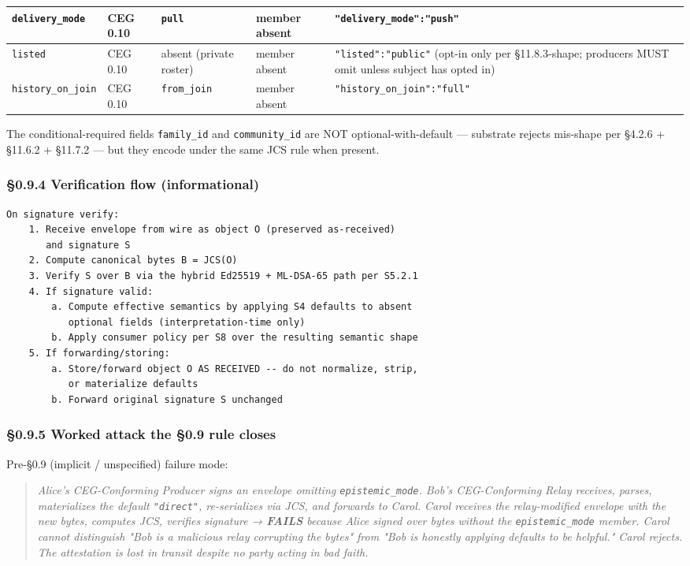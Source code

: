 \documentclass[11pt]{article}
\begin{document}
{\begin{longtable}{|p{3.2cm}|p{3.2cm}|p{3.2cm}|p{3.2cm}|p{3.2cm}|}
\texttt{delivery\_mode} & CEG 0.10 & \texttt{pull} & member absent & \texttt{"delivery\_mode":"push"} \\ \hline
\texttt{listed} & CEG 0.10 & absent (private roster) & member absent & \texttt{"listed":"public"} (opt-in only per §11.8.3-shape; producers MUST omit unless subject has opted in) \\ \hline
\texttt{history\_on\_join} & CEG 0.10 & \texttt{from\_join} & member absent & \texttt{"history\_on\_join":"full"} \\ \hline
\end{longtable}}


The conditional-required fields \texttt{family\_id} and \texttt{community\_id} are NOT optional-with-default — substrate rejects mis-shape per §4.2.6 + §11.6.2 + §11.7.2 — but they encode under the same JCS rule when present.


\subsubsection*{§0.9.4 Verification flow (informational)}


\begin{lstlisting}
On signature verify:
    1. Receive envelope from wire as object O (preserved as-received)
       and signature S
    2. Compute canonical bytes B = JCS(O)
    3. Verify S over B via the hybrid Ed25519 + ML-DSA-65 path per S5.2.1
    4. If signature valid:
        a. Compute effective semantics by applying S4 defaults to absent
           optional fields (interpretation-time only)
        b. Apply consumer policy per S8 over the resulting semantic shape
    5. If forwarding/storing:
        a. Store/forward object O AS RECEIVED -- do not normalize, strip,
           or materialize defaults
        b. Forward original signature S unchanged
\end{lstlisting}

\subsubsection*{§0.9.5 Worked attack the §0.9 rule closes}


Pre-§0.9 (implicit / unspecified) failure mode:


\begin{quote}\itshape Alice's CEG-Conforming Producer signs an envelope omitting \texttt{epistemic\_mode}. Bob's CEG-Conforming Relay receives, parses, materializes the default \texttt{"direct"}, re-serializes via JCS, and forwards to Carol. Carol receives the relay-modified envelope with the new bytes, computes JCS, verifies signature → \textbf{FAILS} because Alice signed over bytes without the \texttt{epistemic\_mode} member. Carol cannot distinguish "Bob is a malicious relay corrupting the bytes" from "Bob is honestly applying defaults to be helpful." Carol rejects. The attestation is lost in transit despite no party acting in bad faith.\end{quote}
\end{document}
